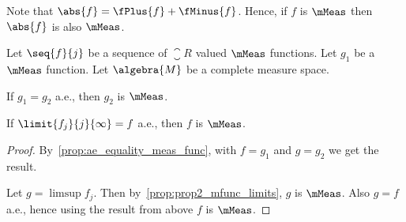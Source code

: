 Note that $\abs{f} = \fPlus{f} + \fMinus{f}$. Hence, if $f$ is $\mMeas$ then $\abs{f}$ is also $\mMeas$. 
\begin{Proposition}\label{prop:prop4_mfunc_ae_limit}
    Let $\seq{f}{j}$ be a sequence of $\closure{R}$ valued $\mMeas$ functions. Let $g_1$ be a $\mMeas$
    function. Let $\algebra{M}$ be a complete
    measure space. 
    \begin{properties}[resume*=mfunc]
    \item
	If $g_1 = g_2$ a.e., then $g_2$ is $\mMeas$.
    \item
	If $\limit{f_j}{j}{\infty} = f$ a.e., then $f$ is $\mMeas$.
    \end{properties}
\end{Proposition}
\begin{proof}
    By~\ref{prop:ae_equality_meas_func}, with $f=g_1$ and $g=g_2$ we get the result.

    Let $g = \limsup f_j$. Then by~\ref{prop:prop2_mfunc_limits}, $g$ is $\mMeas$. Also $g=f$ a.e., hence
    using the result from above $f$ is $\mMeas$.
\end{proof}
